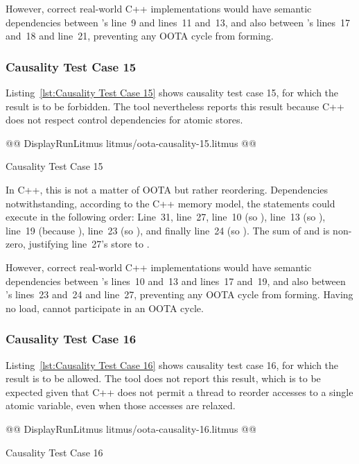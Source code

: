 \documentclass[10]{article}
\begin{document}
However, correct real-world C++ implementations would have semantic
dependencies between 's line~9 and lines~11 and~13, and also
between 's lines~17 and~18 and line~21, preventing any
OOTA cycle from forming.

\subsubsection{Causality Test Case 15}
\label{app:Causality Test Case 15}

Listing~\ref{lst:Causality Test Case 15}
shows causality test case 15, for which the 
result is to be forbidden.
The  tool nevertheless reports this result because C++ does not
respect control dependencies for atomic stores.

\begin{listing}[tbp]
@@ DisplayRunLitmus litmus/oota-causality-15.litmus @@
\caption{Causality Test Case 15}
\label{lst:Causality Test Case 15}
\end{listing}

In C++, this is not a matter of OOTA but rather reordering.
Dependencies notwithstanding, according to the C++ memory model,
the statements could execute in the following order:
Line~31, line~27, line~10 (so ), line~13 (so ),
line~19 (because ), line~23 (so ),
and finally line~24 (so ).
The sum of  and  is non-zero, justifying line~27's
store to .

However, correct real-world C++ implementations would have semantic
dependencies between 's lines~10 and~13 and lines~17 and~19, and also
between 's lines~23 and~24 and line~27, preventing any
OOTA cycle from forming.
Having no load,  cannot participate in an OOTA cycle.

\subsubsection{Causality Test Case 16}
\label{app:Causality Test Case 16}

Listing~\ref{lst:Causality Test Case 16}
shows causality test case 16, for which the 
result is to be allowed.
The  tool does not report this result, which is to be expected
given that C++ does not permit a thread to reorder accesses to a single
atomic variable, even when those accesses are relaxed.

\begin{listing}[tbp]
@@ DisplayRunLitmus litmus/oota-causality-16.litmus @@
\caption{Causality Test Case 16}
\label{lst:Causality Test Case 16}
\end{listing}
\end{document}
